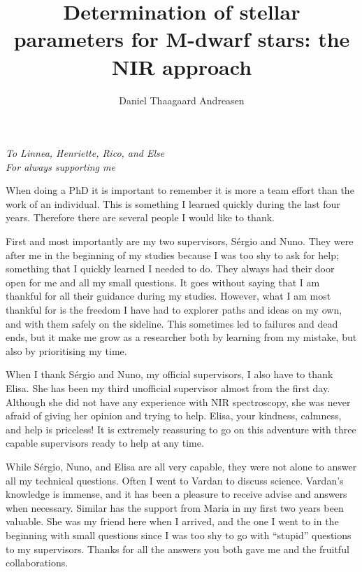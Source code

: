 \documentclass[fleqn]{fcup-thesis}
\author{Daniel Thaagaard Andreasen}
\title{Determination of stellar parameters for M-dwarf stars: the NIR approach}
\begin{document}
\begin{preliminary}

\maketitle
\cleardoublepage


\begin{dedication}
\centering \huge \itshape
To Linnea, Henriette, Rico, and Else\\For always supporting me
\end{dedication}


\begin{acknowledgements}

When doing a PhD it is important to remember it is more a team effort than the work of an
individual. This is something I learned quickly during the last four years. Therefore there are
several people I would like to thank.

First and most importantly are my two supervisors, Sérgio and Nuno. They were after me in the
beginning of my studies because I was too shy to ask for help; something that I quickly learned I
needed to do. They always had their door open for me and all my small questions. It goes without
saying that I am thankful for all their guidance during my studies. However, what I am most thankful
for is the freedom I have had to explorer paths and ideas on my own, and with them safely on the
sideline. This sometimes led to failures and dead ends, but it make me grow as a researcher both by
learning from my mistake, but also by prioritising my time.

When I thank Sérgio and Nuno, my official supervisors, I also have to thank Elisa. She has been my
third unofficial supervisor almost from the first day. Although she did not have any experience with
NIR spectroscopy, she was never afraid of giving her opinion and trying to help. Elisa, your
kindness, calmness, and help is priceless! It is extremely reassuring to go on this adventure with
three capable supervisors ready to help at any time.

While Sérgio, Nuno, and Elisa are all very capable, they were not alone to answer all my technical
questions. Often I went to Vardan to discuss science. Vardan's knowledge is immense, and it has been
a pleasure to receive advise and answers when necessary. Similar has the support from Maria in my
first two years been valuable. She was my friend here when I arrived, and the one I went to in the
beginning with small questions since I was too shy to go with ``stupid'' questions to my
supervisors. Thanks for all the answers you both gave me and the fruitful collaborations.


\end{acknowledgements}
\end{preliminary}
\end{document}
